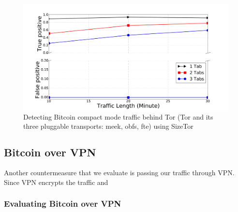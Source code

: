 \begin{figure}
\centering
\includegraphics[scale=0.15]{image/jan25/sizeTor-multiTab.pdf}%
\caption{Detecting Bitcoin compact mode traffic behind Tor (Tor and its three pluggable transports: meek, obfs, fte) using SizeTor}
\label{fig:tor_sizeTor}
\end{figure}


\iffalse
\subsection{Bitcoin over VPN}
Another countermeasure that we evaluate is passing our traffic through VPN. Since VPN encrypts the traffic and 
\subsubsection{Evaluating Bitcoin over VPN}


